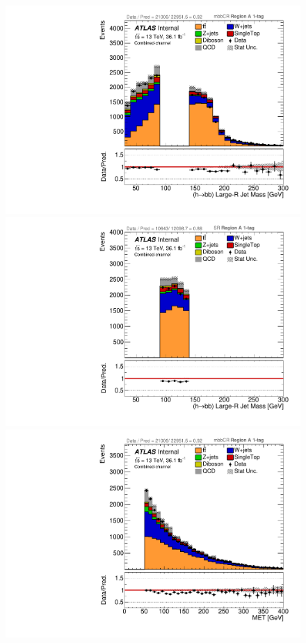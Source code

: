 \begin{figure}[!htbp]
\begin{center}
\includegraphics[scale=0.33]{./figures/boosted/ABCD_1tag0bjet/lepCombined_mbbcr_RegionA_HbbMass_withDD}  
\includegraphics[scale=0.33]{./figures/boosted/ABCD_1tag0bjet/lepCombined_SR_RegionA_HbbMass_withDD}       \\
\includegraphics[scale=0.33]{./figures/boosted/ABCD_1tag0bjet/lepCombined_mbbcr_RegionA_MET_withDD}  

\end{center}
\end{figure}
